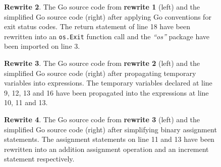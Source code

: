 \begin{figure}[htbp]
	\centering
	\begin{subfigure}[t]{0.45\textwidth}
		
	\end{subfigure}
	\qquad
	\begin{subfigure}[t]{0.45\textwidth}
		
	\end{subfigure}
	\caption{\textbf{Rewrite 2}. The Go source code from \textbf{rewrite 1} (left) and the simplified Go source code (right) after applying Go conventions for exit status codes. The return statement of line 18 have been rewritten into an \texttt{os.Exit} function call and the \textit{``os''} package have been imported on line 3.}
	\label{fig:rewrite_2}
\end{figure}

\begin{figure}[htbp]
	\centering
	\begin{subfigure}[t]{0.45\textwidth}
		
	\end{subfigure}
	\qquad
	\begin{subfigure}[t]{0.45\textwidth}
		
	\end{subfigure}
	\caption{\textbf{Rewrite 3}. The Go source code from \textbf{rewrite 2} (left) and the simplified Go source code (right) after propagating temporary variables into expressions. The temporary variables declared at line 9, 12, 13 and 16 have been propagated into the expressions at line 10, 11 and 13.}
	\label{fig:rewrite_3}
\end{figure}

\begin{figure}[htbp]
	\centering
	\begin{subfigure}[t]{0.45\textwidth}
		
	\end{subfigure}
	\qquad
	\begin{subfigure}[t]{0.45\textwidth}
		
	\end{subfigure}
	\caption{\textbf{Rewrite 4}. The Go source code from \textbf{rewrite 3} (left) and the simplified Go source code (right) after simplifying binary assignment statements. The assignment statements on line 11 and 13 have been rewritten into an addition assignment operation and an increment statement respectively.}
	\label{fig:rewrite_4}
\end{figure}

